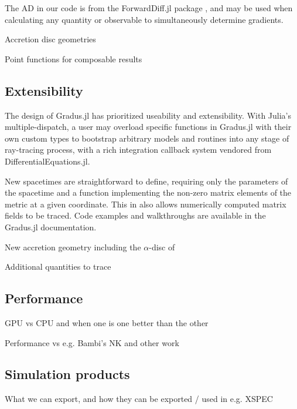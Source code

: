 The AD in our code is from the ForwardDiff.jl package \citep{RevelsLubinPapamarkou2016}, and may be used when calculating any quantity or observable to simultaneously determine gradients.

Accretion disc geometries

Point functions for composable results

\subsection{Extensibility}

The design of Gradus.jl has prioritized useability and extensibility. With Julia's multiple-dispatch, a user may overload specific functions in Gradus.jl with their own custom types to bootstrap arbitrary models and routines into any stage of ray-tracing process, with a rich integration callback system vendored from DifferentialEquations.jl.

New spacetimes are straightforward to define, requiring only the parameters of the spacetime and a function implementing the non-zero matrix elements of the metric at a given coordinate. This in also allows numerically computed matrix fields to be traced. Code examples and walkthroughs are available in the Gradus.jl documentation.

New accretion geometry 
including the $\alpha$-disc of \cite{shakura_black_1973}

Additional quantities to trace

\subsection{Performance}

GPU vs CPU and when one is one better than the other

Performance vs e.g. Bambi's NK and other work

\subsection{Simulation products}

What we can export, and how they can be exported / used in e.g. XSPEC

